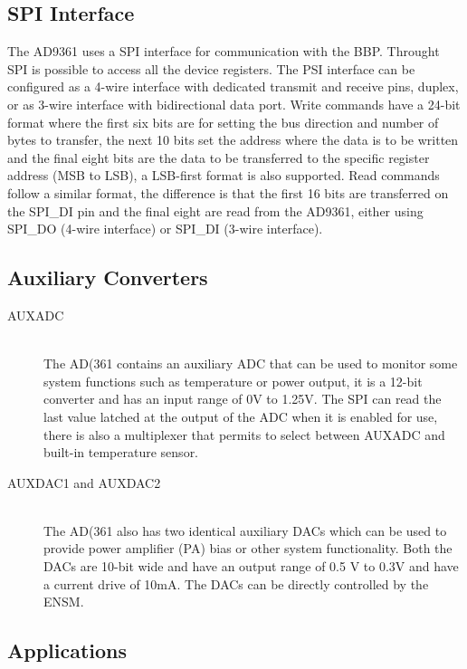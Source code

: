\subsection{SPI Interface}

The AD9361 uses a SPI interface for communication with the BBP. Throught SPI is possible to access all the device registers. The PSI interface can be configured as a 4-wire interface with dedicated transmit and receive pins, duplex, or as 3-wire interface with bidirectional data port. 
Write commands have a 24-bit format where the first six bits are for setting the bus direction and number of bytes to transfer, the next 10 bits set the address where the data is to be written and the final eight bits are the data to be transferred to the specific register address (MSB to LSB), a LSB-first format is also supported.
Read commands follow a similar format, the difference is that the first 16 bits are transferred on the SPI\_DI pin and the final eight are read from the AD9361, either using SPI\_DO (4-wire interface) or SPI\_DI (3-wire interface).

\subsection{Auxiliary Converters}

\begin{description}

	\item[AUXADC] \hfill \\
	The AD(361 contains an auxiliary ADC that can be used to monitor some system functions such as temperature or power output, it is a 12-bit converter and has an input range of 0V to 1.25V. The SPI can read the last value latched at the output of the ADC when it is enabled for use, there is also a multiplexer that permits to select between AUXADC and built-in temperature sensor.

	\item[AUXDAC1 and AUXDAC2] \hfill \\
	The AD(361 also has two identical auxiliary DACs which can be used to provide power amplifier (PA) bias or other system functionality. Both the DACs are 10-bit wide and have an output range of 0.5 V to 0.3V and have a current drive of 10mA. The DACs can be directly controlled by the ENSM.

\end{description}

\subsection{Applications}


